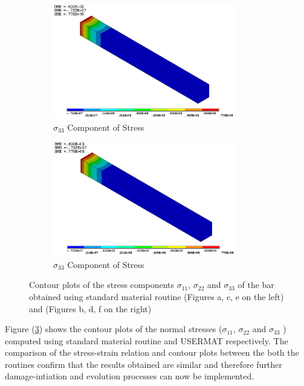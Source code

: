 \documentclass[12pt,a4paper,twoside,openright]{report}
\begin{document}
\begin{figure}[htbp!]\ContinuedFloat     
     \begin{subfigure}[b]{0.4\textwidth}
         \includegraphics[width=8cm,height=5cm]{17.Ansys_SZ.png}
         \caption{$\sigma_{33}$ Component of Stress}
         \label{fig:Z Component of Stress}
     \end{subfigure}
     \hspace{1.8cm}
     \begin{subfigure}[b]{0.4\textwidth}
         \includegraphics[width=8cm,height=5cm]{20.User_SZ.png}
         \caption{$\sigma_{33}$ Component of Stress}
         \label{fig:Z Component of Stress2}
     \end{subfigure}
        \caption{Contour plots of the stress components $\sigma_{11}$, $\sigma_{22}$ and $\sigma_{33}$ of the bar obtained using standard material routine (Figures a, c, e on the left) and  (Figures b, d, f on the right)}
        \label{fig:USERMAT}     
\end{figure}
\FloatBarrier

Figure (\ref{fig:USERMAT}) shows the contour plots of the normal stresses ($\sigma_{11}$, $\sigma_{22}$ and $\sigma_{33}$ ) computed using standard material routine and USERMAT respectively. The comparison of the stress-strain relation and contour plots between the both the routines confirm that the results obtained are similar and therefore further damage-intiation and evolution processes can now be implemented.
\end{document}
